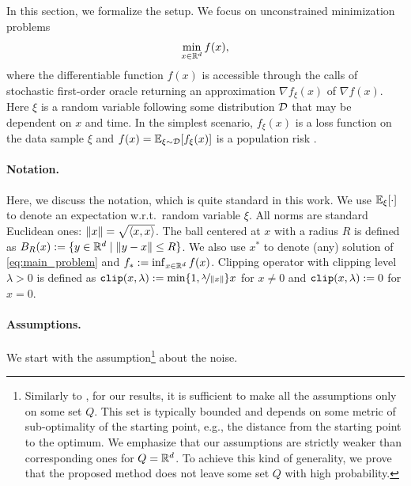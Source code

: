 \documentclass{article}
\begin{document}
In this section, we formalize the  setup. We focus on unconstrained minimization problems
\begin{equation}
    \min\limits_{x\in {\mathbb R}^d}f(x), \label{eq:main_problem}
\end{equation}
where the differentiable function $f(x)$ is accessible through the calls of stochastic first-order oracle returning an approximation $\nabla f_{\xi}(x)$ of $\nabla f(x)$. Here $\xi$ is a random variable following some distribution ${\cal D}$ that may be dependent on $x$ and time. In the simplest scenario, $f_{\xi}(x)$ is a loss function on the data sample $\xi$ and $f(x) = {\mathbb E}_{\xi\sim {\cal D}}[f_{\xi}(x)]$  is a population risk \citep{shalev2014understanding}.

\paragraph{Notation.} Here, we discuss the notation, which is quite standard in this work. We use $\mathbb{E}_{\xi}[\cdot]$ to denote an expectation w.r.t.\ random variable $\xi$. All norms are standard Euclidean ones: $\left\lVert x\right\rVert = \sqrt{\langle x, x \rangle}$. The ball centered at $x$ with a radius $R$ is defined as $B_R(x) := \{y \in {\mathbb R}^d \mid \left\lVert y-x\right\rVert \leq R\}$. We also use $x^*$ to denote (any) solution of \eqref{eq:main_problem} and $f_* := \inf_{x\in {\mathbb R}^d}f(x)$. Clipping operator with clipping level $\lambda > 0$ is defined as $\texttt{clip}(x,\lambda) := \min\{1, \nicefrac{\lambda}{\|x\|}\}x$ for $x\neq 0$ and $\texttt{clip}(x,\lambda) := 0$ for $x = 0$.


\paragraph{Assumptions.} We start with the assumption\footnote{Similarly to \citep{sadiev2023high}, for our results, it is sufficient to make all the assumptions only on some set $Q$. This set is typically bounded and depends on some metric of sub-optimality of the starting point, e.g., the distance from the starting point to the optimum. We emphasize that our assumptions are strictly weaker than corresponding ones for $Q = {\mathbb R}^d$. To achieve this kind of generality, we prove that the proposed method does not leave some set $Q$ with high probability.} about the noise.
\end{document}
